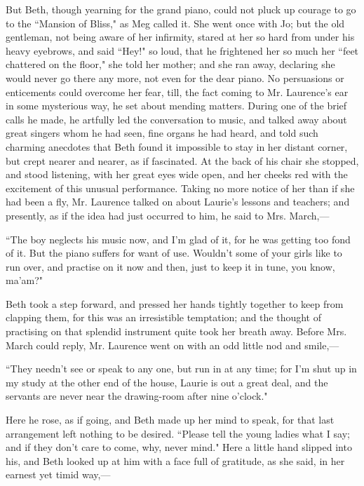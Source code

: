 But Beth, though yearning for the grand piano, could not pluck up
courage to go to the ``Mansion of Bliss," as Meg called it. She went once
with Jo; but the old gentleman, not being aware of her infirmity, stared
at her so hard from under his heavy eyebrows, and said ``Hey!" so loud,
that he frightened her so much her ``feet chattered on the floor," she
told her mother; and she ran away, declaring she would never go there
any more, not even for the dear piano. No persuasions or enticements
could overcome her fear, till, the fact coming to Mr.
Laurence's ear in some mysterious way, he set about
mending matters. During one of the brief calls he made, he artfully led
the conversation to music, and talked away about great singers whom he
had seen, fine organs he had heard, and told such charming anecdotes
that Beth found it impossible to stay in her distant corner, but crept
nearer and nearer, as if fascinated. At the back of his chair she
stopped, and stood listening, with her great eyes wide open, and her
cheeks red with the excitement of this unusual performance. Taking no
more notice of her than if she had been a fly, Mr. Laurence talked on
about Laurie's lessons and teachers; and presently, as
if the idea had just occurred to him, he said to Mrs. March,---

``The boy neglects his music now, and I'm glad of it, for
he was getting too fond of it. But the piano suffers for want of use.
Wouldn't some of your girls like to run over, and
practise on it now and then, just to keep it in tune, you know,
ma'am?"

Beth took a step forward, and pressed her hands tightly together to keep
from clapping them, for this was an irresistible temptation; and the
thought of practising on that splendid instrument quite took her breath
away. Before Mrs. March could reply, Mr. Laurence went on with an odd
little nod and smile,---

``They needn't see or speak to any one, but run in at any
time; for I'm shut up in my study at the other end of
the house, Laurie is out a great deal, and the servants are never near
the drawing-room after nine o'clock."

Here he rose, as if going, and Beth made up her mind to speak, for that
last arrangement left nothing to be desired. ``Please tell the young
ladies what I say; and if they don't care to come, why,
never mind." Here a little hand slipped into his, and Beth looked up at
him with a face full of gratitude, as she said, in her earnest yet timid
way,---


